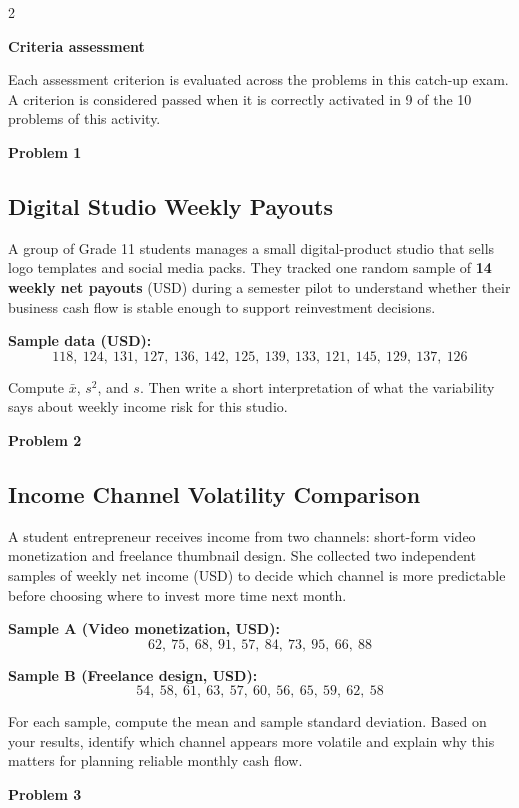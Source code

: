 \documentclass[12pt]{article}
\newcommand{\SubsectionBox}[1]{%
\noindent\colorbox{gray!30}{\parbox{\linewidth}{\textbf{#1}}}\par\vspace{0.35cm}%
}
\begin{document}
\begin{multicols}{2}
	\SubsectionBox{Criteria assessment}\vspace{-0.25cm}
	Each assessment criterion is evaluated across the problems in this catch-up exam. A criterion is considered passed when it is correctly activated in 9 of the 10 problems of this activity.

	\vspace{0.25cm}
\SubsectionBox{Problem 1}
\subsection*{Digital Studio Weekly Payouts}
A group of Grade 11 students manages a small digital-product studio that sells logo templates and social media packs. They tracked one random sample of \textbf{14 weekly net payouts} (USD) during a semester pilot to understand whether their business cash flow is stable enough to support reinvestment decisions.

		\textbf{Sample data (USD):}
		\[118,\ 124,\ 131,\ 127,\ 136,\ 142,\ 125,\ 139,\ 133,\ 121,\ 145,\ 129,\ 137,\ 126\]

		Compute $\bar{x}$, $s^2$, and $s$. Then write a short interpretation of what the variability says about weekly income risk for this studio.

\vspace{0.5cm}
\SubsectionBox{Problem 2}
\subsection*{Income Channel Volatility Comparison}
A student entrepreneur receives income from two channels: short-form video monetization and freelance thumbnail design. She collected two independent samples of weekly net income (USD) to decide which channel is more predictable before choosing where to invest more time next month.

		\textbf{Sample A (Video monetization, USD):}
		\[62,\ 75,\ 68,\ 91,\ 57,\ 84,\ 73,\ 95,\ 66,\ 88\]

		\textbf{Sample B (Freelance design, USD):}
		\[54,\ 58,\ 61,\ 63,\ 57,\ 60,\ 56,\ 65,\ 59,\ 62,\ 58\]

		For each sample, compute the mean and sample standard deviation. Based on your results, identify which channel appears more volatile and explain why this matters for planning reliable monthly cash flow.

\vspace{0.5cm}
\SubsectionBox{Problem 3}

\end{multicols}
\end{document}
